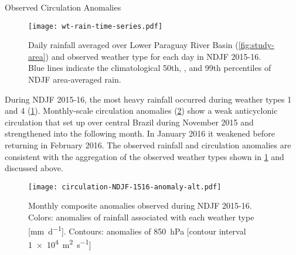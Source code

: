 \begin{block}{Observed Circulation Anomalies}
  \begin{mdframed}
  \begin{figure}
    \caption{
  		Daily rainfall averaged over Lower Paraguay River Basin (\cref{fig:study-area}) and observed weather type for each day in NDJF 2015-16.
      Blue lines indicate the climatological 50th, , and 99th percentiles of NDJF area-averaged rain.
      \label{fig:rain-wt}
  	}
  	\noindent\texttt{[image: wt-rain-time-series.pdf]}
  \end{figure}
  \end{mdframed}

  During NDJF 2015-16, the most heavy rainfall occurred during weather types 1 and 4 (\cref{fig:rain-wt}).
  Monthly-scale circulation anomalies (\cref{fig:anomalies}) show a weak anticyclonic circulation that set up over central Brazil during November 2015 and strengthened into the following month.
  In January 2016 it weakened before returning in February 2016.
  The observed rainfall and circulation anomalies are consistent with the aggregation of the observed weather types shown in \cref{fig:rain-wt} and discussed above.

  \begin{mdframed}
  \begin{figure}
  	\noindent\texttt{[image: circulation-NDJF-1516-anomaly-alt.pdf]}
  	\caption{
      	Monthly composite anomalies observed during NDJF 2015-16.
        Colors: anomalies of rainfall associated with each weather type [\si{\milli\meter\per\day}].
        Contours: anomalies of \SI{850}{\hecto\pascal} [contour interval \SI{1e4}{\meter\squared\per\second}]
        \label{fig:anomalies}
  	}
  \end{figure}
  \end{mdframed}
\end{block}
